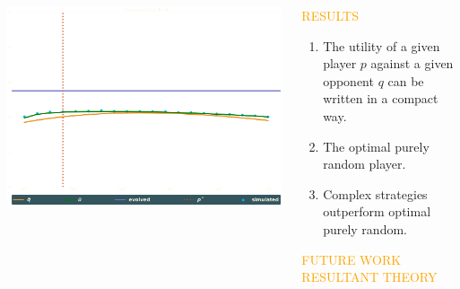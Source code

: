 \documentclass[usenames,dvipsnames,t]{beamer}
\begin{document}
\begin{columns}
\begin{column}{.7\linewidth}
\begin{columns}
\begin{column}{.5\linewidth}
\begin{center}
                \includegraphics[width=.7\textwidth]{static/tournament}
            \end{center}
        \end{column}
    \end{columns}
    \end{column}
    \begin{column}{.2\linewidth}
        \begin{center}
            \textcolor{orange}{\Large{RESULTS}}
        \begin{center}
            \begin{enumerate}
                \item The utility of a given player \(p\) against a given opponent \(q\) 
                can be written in a compact way.
                \item The optimal purely random player.
                \item Complex strategies outperform optimal purely random.
            \end{enumerate}
            \vspace{3cm}
    
            \begin{center}
                \textcolor{orange}{\Large{FUTURE WORK}} \\
                \textcolor{orange}{\small{RESULTANT THEORY}}
            \end{center}
        \begin{center}
            
        \end{center}
        \end{center}
        \end{center}
    \end{column}
\end{columns}
\vspace{3cm}
\end{document}
